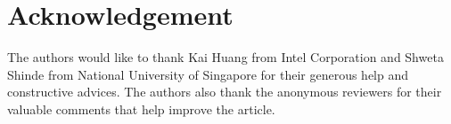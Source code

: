 \section*{Acknowledgement}

The authors would like to thank Kai Huang from Intel Corporation and Shweta Shinde from National University of Singapore for their generous help and constructive advices. The authors also thank the anonymous reviewers for their valuable comments that help improve the article.
